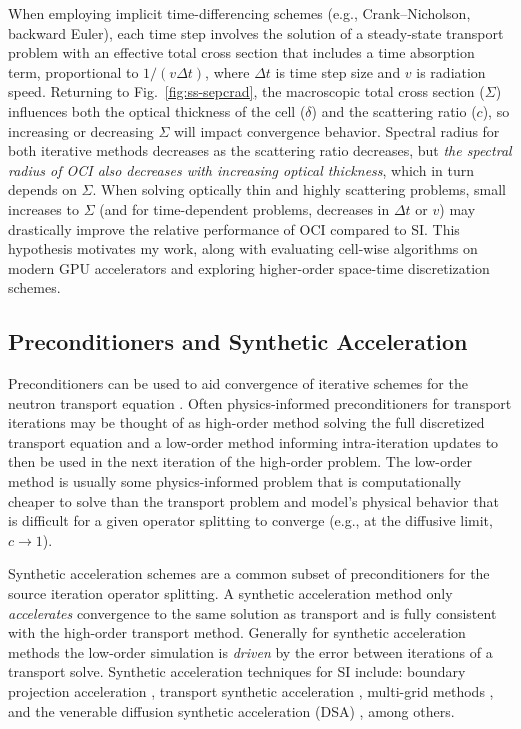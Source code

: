 When employing implicit time-differencing schemes (e.g., Crank--Nicholson, backward Euler), each time step involves the solution of a steady-state transport problem with an effective total cross section that includes a time absorption term, proportional to $1/(v \Delta t)$, where $\Delta t$ is time step size and $v$ is radiation speed.
Returning to Fig.~\ref{fig:ss-sepcrad}, the macroscopic total cross section ($\Sigma$) influences both the optical thickness of the cell ($\delta$) and the scattering ratio ($c$), so increasing or decreasing $\Sigma$ will impact convergence behavior.
Spectral radius for both iterative methods decreases as the scattering ratio decreases, but \textit{the spectral radius of OCI also decreases with increasing optical thickness}, which in turn depends on $\Sigma$.
When solving optically thin and highly scattering problems, small increases to $\Sigma$ (and for time-dependent problems, decreases in $\Delta t$ or $v$) may drastically improve the relative performance of OCI compared to SI.
This hypothesis motivates my work, along with evaluating cell-wise algorithms on modern GPU accelerators and exploring higher-order space-time discretization schemes.

\subsection{Preconditioners and Synthetic Acceleration}
\label{c2:precon}

Preconditioners can be used to aid convergence of iterative schemes for the neutron transport equation \cite{adams_fast_2002}.
Often physics-informed preconditioners for transport iterations may be thought of as high-order method solving the full discretized transport equation and a low-order method informing intra-iteration updates to then be used in the next iteration of the high-order problem.
The low-order method is usually some physics-informed problem that is computationally cheaper to solve than the transport problem and model's physical behavior that is difficult for a given operator splitting to converge (e.g., at the diffusive limit, $c\rightarrow1$).

Synthetic acceleration schemes are a common subset of preconditioners for the source iteration operator splitting.
A synthetic acceleration method only \textit{accelerates} convergence to the same solution as transport and is fully consistent with the high-order transport method.
Generally for synthetic acceleration methods the low-order simulation is \textit{driven} by the error between iterations of a transport solve.
Synthetic acceleration techniques for SI include:
boundary projection acceleration \cite{adams_boundary_1988}, 
transport synthetic acceleration \cite{ramone_1997_tsa},
multi-grid methods \cite{man1994parallel},
and the venerable diffusion synthetic acceleration (DSA) \cite{larsen_1983_dsaforsn}, among others.

